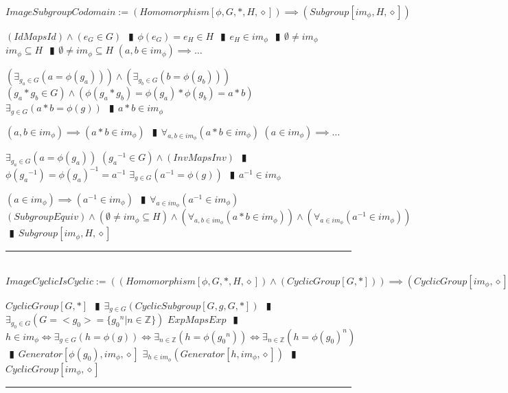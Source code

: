\documentclass{book}
\newcommand{\abr}{:=}
\newcommand{\pipe}{$\phantom{(}\vrectangleblack\phantom{)}$}
\newcommand{\pr}[1]{\left(#1\right)}
\begin{document}
$ImageSubgroupCodomain \abr (Homomorphism[\phi, G, *, H, \diamond]) \implies (Subgroup[im_\phi, H, \diamond])$
\begin{enumerate}
  \lit $(IdMapsId) \land (e_G \in G)$ \pipe $\phi(e_G) = e_H \in H$ \pipe $e_H \in im_\phi$ \pipe $\emptyset \neq im_\phi$
  \lit $im_\phi \subseteq H$ \pipe $\emptyset \neq im_\phi \subseteq H$
  \lit $(a, b \in im_\phi) \implies \ldots$
  \begin{enumerate}
    \lit $\pr{\exists_{g_a \in G}\pr{a = \phi(g_a)}} \land \pr{\exists_{g_b \in G}\pr{b = \phi(g_b)}}$
    \lit $(g_a * g_b \in G) \land \pr{\phi(g_a * g_b) = \phi(g_a) * \phi(g_b) = a * b}$
    \lit $\exists_{g \in G}\pr{a * b = \phi(g)}$ \pipe $a * b \in im_\phi$
  \end{enumerate}
  \lit $(a, b \in im_\phi) \implies (a * b \in im_\phi)$ \pipe $\forall_{a, b \in im_\phi}(a * b \in im_\phi)$
  \lit $(a \in im_\phi) \implies \ldots$
  \begin{enumerate}
    \lit $\exists_{g_a \in G}\pr{a = \phi(g_a)}$
    \lit $({g_a}^{-1} \in G) \land (InvMapsInv)$ \pipe $\phi({g_a}^{-1}) = \phi(g_a)^{-1} = a^{-1}$
    \lit $\exists_{g \in G}\pr{a^{-1} = \phi(g)}$ \pipe $a^{-1} \in im_\phi$
  \end{enumerate}
  \lit $(a \in im_\phi) \implies (a^{-1} \in im_\phi)$ \pipe $\forall_{a \in im_\phi}(a^{-1} \in im_\phi)$
  \lit $(SubgroupEquiv) \land (\emptyset \neq im_\phi \subseteq H) \land \pr{\forall_{a, b \in im_\phi}(a * b \in im_\phi)} \land \pr{\forall_{a \in im_\phi}(a^{-1} \in im_\phi)}$ \pipe $Subgroup[im_\phi, H, \diamond]$
\end{enumerate} \vspace{.75mm} \hrule \vspace{.75mm} \ \\ 

$ImageCyclicIsCyclic \abr \pr{(Homomorphism[\phi, G, *, H, \diamond]) \land (CyclicGroup[G, *])} \implies (CyclicGroup[im_\phi, \diamond])$
\begin{enumerate}
  \lit $CyclicGroup[G, *]$ \pipe $\exists_{g \in G}(CyclicSubgroup[G, g, G, *])$ \pipe $\exists_{g_0 \in G}(G = <g_0> = \{{g_0}^n | n \in \mathbb{Z}\})$
  \lit $ExpMapsExp$ \pipe $h \in im_\phi \iff \exists_{g \in G}\pr{h = \phi(g)} \iff \exists_{n \in \mathbb{Z}}\pr{h = \phi({g_0}^n)} \iff \exists_{n \in \mathbb{Z}}\pr{h = \phi(g_0)^n}$ \pipe $Generator[\phi(g_0), im_\phi, \diamond]$
  \lit $\exists_{h \in im_\phi}(Generator[h, im_\phi, \diamond])$ \pipe $CyclicGroup[im_\phi, \diamond]$
\end{enumerate} \vspace{.75mm} \hrule \vspace{.75mm} \ \\ 
\end{document}
